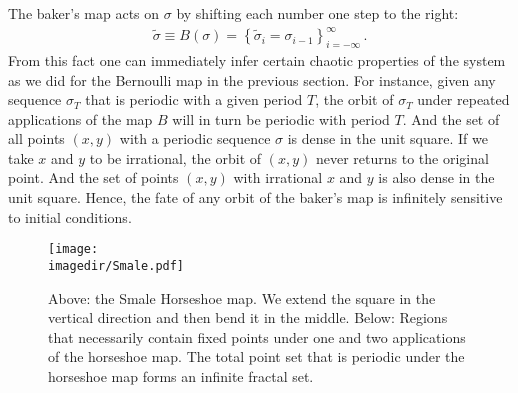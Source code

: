 The baker's map acts on $\sigma$ by shifting each number one step to the right:
\begin{gather}
\tilde{\sigma} \equiv   B(\sigma)  = \left\{ \tilde{\sigma}_i=\sigma_{i-1} \right\}^\infty_{i=-\infty}\,.
\end{gather}
From this fact one can immediately infer certain chaotic properties of the system as we did for the Bernoulli map in the previous section. For instance, given any sequence $\sigma_T$ that is periodic with a given period $T$, the orbit of $\sigma_T$ under repeated applications of the map $B$ will in turn be periodic with period $T$. And the set of all points $(x,y)$ with a periodic sequence $\sigma$ is dense in the unit square. If we take $x$ and $y$ to be irrational, the orbit of $(x,y)$ never returns to the original point. And the set of points $(x,y)$ with irrational $x$ and $y$ is also dense in the unit square. Hence, the fate of any orbit of the baker's map is infinitely sensitive to initial conditions.
\begin{figure}
    \centering
  \texttt{[image: \\imagedir/Smale.pdf]}
    
    \caption{Above: the Smale Horseshoe map. We extend the square in the vertical direction and then bend it in the middle. Below: Regions that necessarily contain fixed points under one and two applications of the horseshoe map. The total point set that is periodic under the horseshoe map forms an infinite fractal set.}
    \label{fig:SHmap}
\end{figure}

